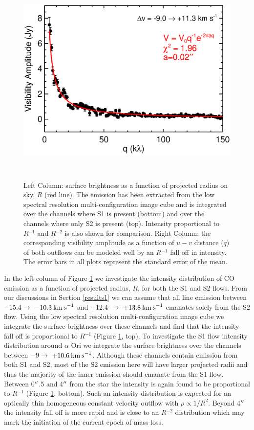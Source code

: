 \documentclass[iop]{emulateapj}
\begin{document}
\begin{figure}[hbt!]
{          \includegraphics[scale=0.50]{f17.eps}

          }
\\
\caption{Left Column: surface brightness as a function of projected radius on sky, $R$ (red line). The emission has been extracted from the low spectral resolution multi-configuration image cube and is integrated over the channels where S1 is present (bottom) and over the channels where only S2 is present (top). Intensity proportional to $R{}^{-1}$ and $R{}^{-2}$ is also shown for comparison. Right Column: the corresponding visibility amplitude as a function of $u-v$ distance ($q$) of both outflows can be modeled well by an $R{}^{-1}$ fall off in intensity. The error bars in all plots represent the standard error of the mean.}
\label{fig:fig6}
\end{figure}

In the left column of Figure \ref{fig:fig6} we investigate the intensity distribution of CO emission as a function of projected radius, $R$, for both the S1 and S2 flows. From our discussions in Section \ref{results1} we can assume that all line emission between $-15.4 \rightarrow$ $-10.3\>{\rm km\>s}^{-1}$ and +12.4 $\rightarrow$ $+13.8\>{\rm km\>s}^{-1}$ emanates solely from the S2 flow. Using the low spectral resolution multi-configuration image cube we integrate the surface brightness over these channels and find that the intensity fall off is proportional to $R{}^{-1}$ (Figure \ref{fig:fig6}, top). To investigate the S1 flow intensity distribution around $\alpha$ Ori we integrate the surface brightness over the channels between $-9 \rightarrow$ $+10.6\>{\rm km\>s}^{-1}$. Although these channels contain emission from both S1 and S2, most of the S2 emission here will have larger projected radii and thus the majority of the inner emission should emanate from the S1 flow.  Between 0$\mbox{$^{\prime\prime}$}$.5 and 4$\mbox{$^{\prime\prime}$}$ from the star the intensity is again found to be proportional to $R{}^{-1}$ (Figure \ref{fig:fig6}, bottom). Such an intensity distribution is expected for an optically thin homogeneous constant velocity outflow with $\rho \propto 1/R^{2}$. Beyond 4$\mbox{$^{\prime\prime}$}$ the intensity fall off is more rapid and is close to an $R{}^{-2}$ distribution which may mark the initiation of the current epoch of mass-loss.
\end{document}
